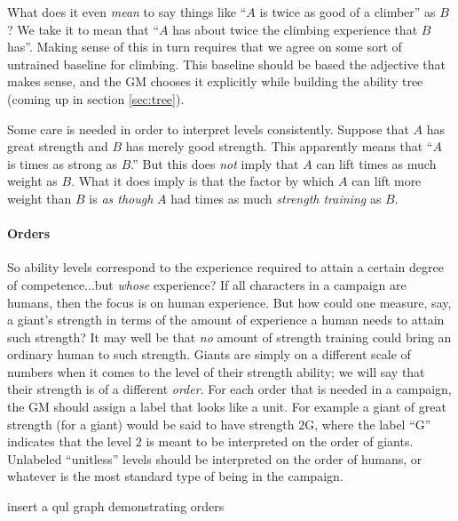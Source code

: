 \documentclass[12pt]{article}
\newcommand{\notes}[1]{{\color{Tan} #1}}
\newcommand{\emdex}[1]{\emph{#1}\index{#1}}
\begin{document}
What does it even \emph{mean} to say things like ``$A$ is twice as good of a climber'' as $B$?
We take it to mean that ``$A$ has about twice the climbing experience that $B$ has''.
Making sense of this in turn requires that we agree on some sort of untrained baseline for climbing.
This baseline should be based the adjective that makes sense, and the GM chooses it
explicitly while building the ability tree (coming up in section \ref{sec:tree}).

Some care is needed in order to interpret levels consistently.
Suppose that $A$ has great strength and $B$ has merely good strength.
This apparently means that ``$A$ is  times as strong as $B$.''
But this does \emph{not} imply that $A$ can lift  times as much weight as $B$.
What it does imply is that the factor by which $A$ can lift more weight than $B$ is
\emph{as though} $A$ had  times as much \emph{strength training} as $B$.

\paragraph{Orders}
So ability levels correspond to the experience required to attain a certain degree of competence...but \emph{whose} experience?
If all characters in a campaign are humans, then the focus is on human experience.
But how could one measure, say, a giant's strength in terms of the amount of experience a human needs to attain such strength?
It may well be that \emph{no} amount of strength training could bring an ordinary human to such strength.
Giants are simply on a different scale of numbers when it comes to the level of their strength ability;
we will say that their strength is of a different \emdex{order}.
For each order that is needed in a campaign, the GM should assign a label that looks like a unit.
For example a giant of great strength (for a giant) would be said to have strength $2$G,
where the label ``G'' indicates that the level $2$ is meant to be interpreted on the order of giants.
Unlabeled ``unitless'' levels should be interpreted on the order of humans, or whatever is the
most standard type of being in the campaign.

\notes{insert a qul graph demonstrating orders}
\end{document}

